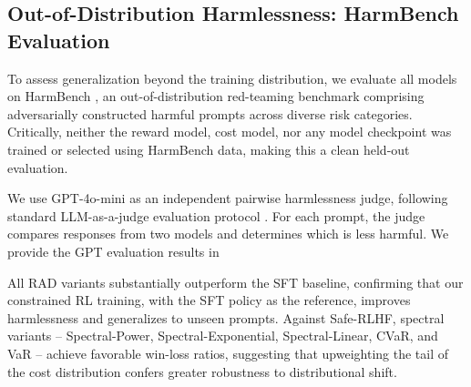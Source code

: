 \subsection{Out-of-Distribution Harmlessness: HarmBench Evaluation}

To assess generalization beyond the training distribution, we evaluate
all models on HarmBench \citep{mazeika2024harmbenchstandardizedevaluationframework}, an out-of-distribution
red-teaming benchmark comprising adversarially constructed harmful prompts
across diverse risk categories. Critically, neither the reward model, cost
model, nor any model checkpoint was trained or selected using HarmBench
data, making this a clean held-out evaluation.

We use GPT-4o-mini \citep{openai2024gpt4omini} as an independent pairwise harmlessness judge,
following standard LLM-as-a-judge \citep{zheng2023judgingllmasajudgemtbenchchatbot} evaluation protocol \cite{}. For each
prompt, the judge compares responses from two models and determines which
is less harmful. We provide the GPT evaluation results in 

All RAD variants substantially outperform the SFT baseline, confirming that our constrained RL training, with the SFT policy as the reference, improves harmlessness and generalizes to unseen prompts.  Against Safe-RLHF, spectral variants -- Spectral-Power, Spectral-Exponential, Spectral-Linear, CVaR, and VaR -- achieve favorable win-loss ratios, suggesting that upweighting the tail of the cost distribution confers greater robustness to distributional shift. 




